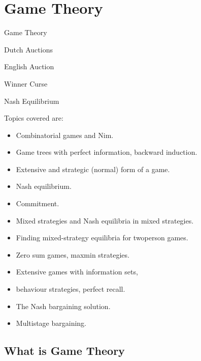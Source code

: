 \documentclass[]{report}
\begin{document}
\chapter{Game Theory}	
	Game Theory

Dutch Auctions

English Auction

Winner Curse

Nash Equilibrium

Topics covered are:
\begin{multicols}{2}
\begin{itemize}
\item Combinatorial games and Nim.

\item Game trees with perfect information, backward induction.

\item Extensive and strategic (normal) form of a game.

\item Nash equilibrium.

\item Commitment.

\item Mixed strategies and Nash equilibria in mixed strategies.

\item Finding mixed-strategy equilibria for twoperson games.

\item Zero sum games, maxmin strategies.

\item Extensive games with information sets,

\item behaviour strategies, perfect recall.

\item The Nash bargaining solution.

\item Multistage bargaining.
\end{itemize}

\end{multicols}

\section{What is Game Theory}
\end{document}
